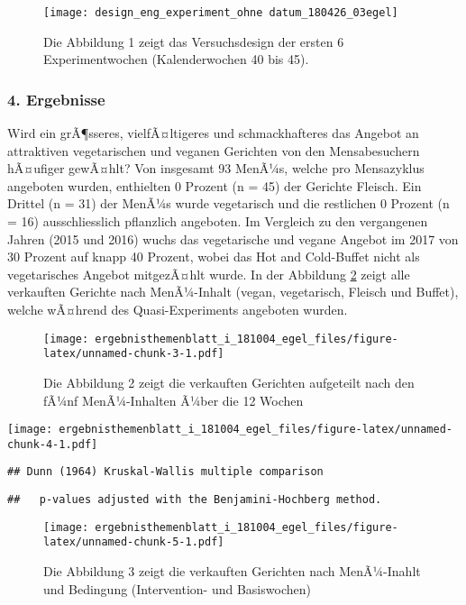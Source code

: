 \documentclass[12pt,ngerman,]{article}
\begin{document}
\begin{figure}
\texttt{[image: design\_eng\_experiment\_ohne datum\_180426\_03egel]} \caption{\label{fig:fig1} Die Abbildung 1 zeigt das Versuchsdesign der ersten 6 Experimentwochen (Kalenderwochen 40 bis 45).}\label{fig:unnamed-chunk-2}
\end{figure}

\hypertarget{ergebnisse}{%
\subsubsection{4. Ergebnisse}\label{ergebnisse}}

Wird ein grÃ¶sseres, vielfÃ¤ltigeres und schmackhafteres das Angebot an
attraktiven vegetarischen und veganen Gerichten von den Mensabesuchern
hÃ¤ufiger gewÃ¤hlt? Von insgesamt 93 MenÃ¼s, welche pro Mensazyklus
angeboten wurden, enthielten 0 Prozent (n = 45) der Gerichte Fleisch.
Ein Drittel (n = 31) der MenÃ¼s wurde vegetarisch und die restlichen 0
Prozent (n = 16) ausschliesslich pflanzlich angeboten. Im Vergleich zu
den vergangenen Jahren (2015 und 2016) wuchs das vegetarische und vegane
Angebot im 2017 von 30 Prozent auf knapp 40 Prozent, wobei das Hot and
Cold-Buffet nicht als vegetarisches Angebot mitgezÃ¤hlt wurde. In der
Abbildung \ref{fig:fig2} zeigt alle verkauften Gerichte nach
MenÃ¼-Inhalt (vegan, vegetarisch, Fleisch und Buffet), welche wÃ¤hrend
des Quasi-Experiments angeboten wurden.

\begin{figure}
\centering
\texttt{[image: ergebnisthemenblatt\_i\_181004\_egel\_files/figure-latex/unnamed-chunk-3-1.pdf]}
\caption{\label{fig:fig2} Die Abbildung 2 zeigt die verkauften Gerichten
aufgeteilt nach den fÃ¼nf MenÃ¼-Inhalten Ã¼ber die 12 Wochen}
\end{figure}

\texttt{[image: ergebnisthemenblatt\_i\_181004\_egel\_files/figure-latex/unnamed-chunk-4-1.pdf]}

\begin{verbatim}
## Dunn (1964) Kruskal-Wallis multiple comparison
\end{verbatim}

\begin{verbatim}
##   p-values adjusted with the Benjamini-Hochberg method.
\end{verbatim}

\begin{figure}
\centering
\texttt{[image: ergebnisthemenblatt\_i\_181004\_egel\_files/figure-latex/unnamed-chunk-5-1.pdf]}
\caption{\label{fig:fig3} Die Abbildung 3 zeigt die verkauften Gerichten
nach MenÃ¼-Inahlt und Bedingung (Intervention- und Basiswochen)}
\end{figure}
\end{document}
